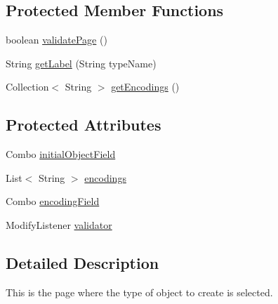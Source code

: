 \subsection*{Protected Member Functions}
\begin{DoxyCompactItemize}
\item 
boolean \hyperlink{classshootingmachineemfmodel_1_1presentation_1_1_shootingmachineemfmodel_model_wizard_1_1_shootia3fbc6bd8d9af3fefbb57f601e613dce_a7deaa7cc5166840a373de7e0feda8be1}{validate\-Page} ()
\item 
String \hyperlink{classshootingmachineemfmodel_1_1presentation_1_1_shootingmachineemfmodel_model_wizard_1_1_shootia3fbc6bd8d9af3fefbb57f601e613dce_ac016ec5e621f6f09e2b7d6c584aebcb4}{get\-Label} (String type\-Name)
\item 
Collection$<$ String $>$ \hyperlink{classshootingmachineemfmodel_1_1presentation_1_1_shootingmachineemfmodel_model_wizard_1_1_shootia3fbc6bd8d9af3fefbb57f601e613dce_a068bfc335bbd86290c43398c1088bde0}{get\-Encodings} ()
\end{DoxyCompactItemize}
\subsection*{Protected Attributes}
\begin{DoxyCompactItemize}
\item 
Combo \hyperlink{classshootingmachineemfmodel_1_1presentation_1_1_shootingmachineemfmodel_model_wizard_1_1_shootia3fbc6bd8d9af3fefbb57f601e613dce_a2a2dd4a3ab0e4747e24bb0bbaa0c6377}{initial\-Object\-Field}
\item 
List$<$ String $>$ \hyperlink{classshootingmachineemfmodel_1_1presentation_1_1_shootingmachineemfmodel_model_wizard_1_1_shootia3fbc6bd8d9af3fefbb57f601e613dce_a1ffc3527b5dadb211386c07653dd3018}{encodings}
\item 
Combo \hyperlink{classshootingmachineemfmodel_1_1presentation_1_1_shootingmachineemfmodel_model_wizard_1_1_shootia3fbc6bd8d9af3fefbb57f601e613dce_ab45664087f2c94f64141d40ecacafbd9}{encoding\-Field}
\item 
Modify\-Listener \hyperlink{classshootingmachineemfmodel_1_1presentation_1_1_shootingmachineemfmodel_model_wizard_1_1_shootia3fbc6bd8d9af3fefbb57f601e613dce_a1880fd5f61a1e1af264a323e11802175}{validator}
\end{DoxyCompactItemize}


\subsection{Detailed Description}
This is the page where the type of object to create is selected.

